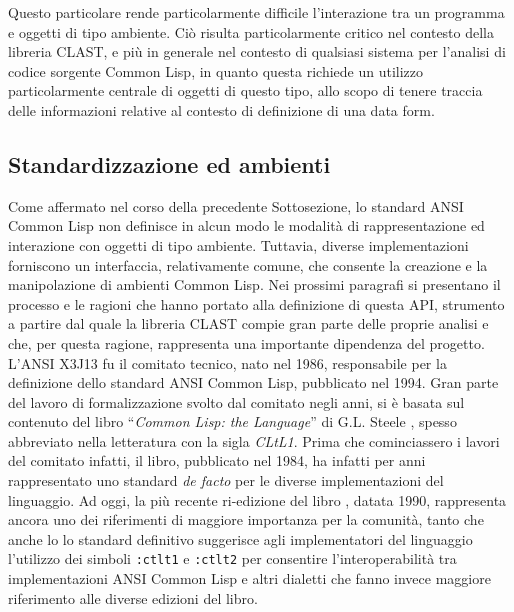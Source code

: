 Questo particolare rende particolarmente difficile l'interazione tra un
programma e oggetti di tipo ambiente. Ciò risulta particolarmente critico nel
contesto della libreria CLAST, e più in generale nel contesto di qualsiasi
sistema per l'analisi di codice sorgente Common Lisp, in quanto questa richiede
un utilizzo particolarmente centrale di oggetti di questo tipo, allo scopo di
tenere traccia delle informazioni relative al contesto di definizione di una
data form.

\subsection{Standardizzazione ed ambienti}

Come affermato nel corso della precedente Sottosezione, lo standard ANSI Common
Lisp non definisce in alcun modo le modalità di rappresentazione ed interazione
con oggetti di tipo ambiente. Tuttavia, diverse implementazioni forniscono un
interfaccia, relativamente comune, che consente la creazione e la manipolazione
di ambienti Common Lisp. Nei prossimi paragrafi si presentano il processo e le
ragioni che hanno portato alla definizione di questa API, strumento a partire
dal quale la libreria CLAST compie gran parte delle proprie analisi e che, per
questa ragione, rappresenta una importante dipendenza del progetto.\\

L’ANSI X3J13 fu il comitato tecnico, nato nel 1986, responsabile per la
definizione dello standard ANSI Common Lisp, pubblicato nel 1994. Gran parte del
lavoro di formalizzazione svolto dal comitato negli anni, si è basata sul
contenuto del libro \enquote{\textit{Common Lisp: the Language}} di G.L. Steele
\cite{steele1984common}, spesso abbreviato nella letteratura con la sigla
\textit{CLtL1}. Prima che cominciassero i lavori del comitato infatti, il libro,
pubblicato nel 1984, ha infatti per anni rappresentato uno standard \textit
{de facto} per le diverse implementazioni del linguaggio. Ad oggi, la più recente
ri-edizione del libro \cite{steele1990common}, datata 1990, rappresenta ancora
uno dei riferimenti di maggiore importanza per la comunità, tanto che anche lo
lo standard definitivo suggerisce agli implementatori del linguaggio
l’utilizzo dei simboli \texttt{:ctlt1} e \texttt{:ctlt2} per consentire
l’interoperabilità tra implementazioni ANSI Common Lisp e altri dialetti che
fanno invece maggiore riferimento alle diverse edizioni del libro.\\

